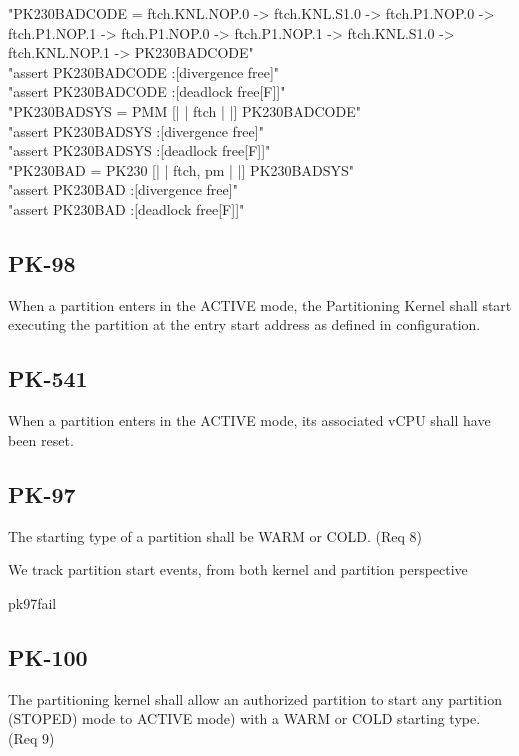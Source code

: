 \begin{assert}
"PK230BADCODE = ftch.KNL.NOP.0 -> ftch.KNL.S1.0 -> ftch.P1.NOP.0 -> ftch.P1.NOP.1 -> ftch.P1.NOP.0 -> ftch.P1.NOP.1 -> ftch.KNL.S1.0 -> ftch.KNL.NOP.1 -> PK230BADCODE"\\

   \also "assert PK230BADCODE :[divergence free]"\\
   \also "assert PK230BADCODE :[deadlock free[F]]"\\

   \also "PK230BADSYS = PMM [| {| ftch |} |] PK230BADCODE"\\

   \also "assert PK230BADSYS :[divergence free]"\\
   \also "assert PK230BADSYS :[deadlock free[F]]"\\

   \also "PK230BAD = PK230 [| {| ftch, pm |} |] PK230BADSYS"\\

   \also "assert PK230BAD :[divergence free]"\\
   \also "assert PK230BAD :[deadlock free[F]]"
\end{assert}
\subsection{PK-98}
When a partition enters in the ACTIVE mode, the Partitioning Kernel shall start executing the partition at the entry start address as defined in configuration.

\subsection{PK-541}
When a partition enters in the ACTIVE mode,  its associated vCPU shall have been reset.

\subsection{PK-97}
The starting type of a partition shall be WARM or COLD. (Req 8)

We track partition start events, from both kernel and partition perspective

\begin{circus}
\circchannel pk97fail
\end{circus}


\subsection{PK-100}
The partitioning kernel shall allow an authorized partition to start any partition (STOPED) mode to ACTIVE mode)  with a WARM or COLD starting type. (Req 9)

